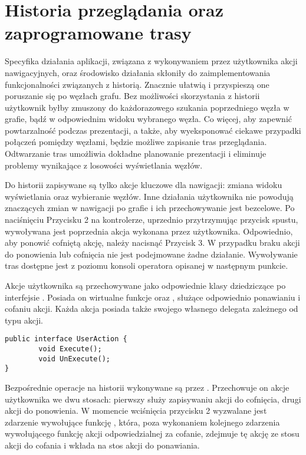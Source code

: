 \section{Historia przeglądania oraz zaprogramowane trasy}
\label{sec:history}
Specyfika działania aplikacji, związana z wykonywaniem przez użytkownika akcji nawigacyjnych, oraz środowisko działania skłoniły do zaimplementowania funkcjonalności związanych z historią. Znacznie ułatwią i przyspieszą one poruszanie się po węzłach grafu. Bez możliwości skorzystania z historii użytkownik byłby zmuszony do każdorazowego szukania poprzedniego węzła  w grafie, bądź w odpowiednim widoku wybranego węzła. Co więcej, aby zapewnić powtarzalność podczas prezentacji, a także, aby wyeksponować ciekawe przypadki połączeń pomiędzy węzłami, będzie możliwe zapisanie tras przeglądania. Odtwarzanie tras umożliwia dokładne planowanie prezentacji i eliminuje problemy wynikające z losowości wyświetlania węzłów. 

Do historii zapisywane są tylko akcje kluczowe dla nawigacji: zmiana widoku wyświetlania oraz wybieranie węzłów. Inne działania użytkownika nie powodują znaczących zmian w nawigacji po grafie i ich przechowywanie jest bezcelowe. Po naciśnięciu Przycisku 2 na kontrolerze, uprzednio przytrzymując przycisk spustu, wywoływana jest poprzednia akcja wykonana przez użytkownika. Odpowiednio, aby ponowić cofniętą akcję, należy nacisnąć Przycisk 3. W przypadku braku akcji do ponowienia lub cofnięcia nie jest podejmowane żadne działanie. Wywoływanie tras dostępne jest z poziomu konsoli operatora opisanej w następnym punkcie.

Akcje użytkownika są przechowywane jako odpowiednie klasy dziedziczące po interfejsie  . Posiada on wirtualne funkcje   oraz  , służące odpowiednio ponawianiu i cofaniu akcji. Każda akcja posiada także swojego własnego delegata zależnego od typu akcji. 

\begin{lstlisting}[caption={Interfejs UserAction}, label=lst:IUserAction]
public interface UserAction {
		void Execute();
		void UnExecute();
}
\end{lstlisting}


Bezpośrednie operacje na historii wykonywane są przez  . Przechowuje on akcje użytkownika we dwu stosach: pierwszy służy zapisywaniu akcji do cofnięcia, drugi akcji do ponowienia. W momencie wciśnięcia przycisku 2 wyzwalane jest zdarzenie wywołujące funkcję  , która, poza wykonaniem kolejnego zdarzenia wywołującego funkcję akcji odpowiedzialnej za cofanie, zdejmuje tę akcję ze stosu akcji do cofania i wkłada na stos akcji do ponawiania.

